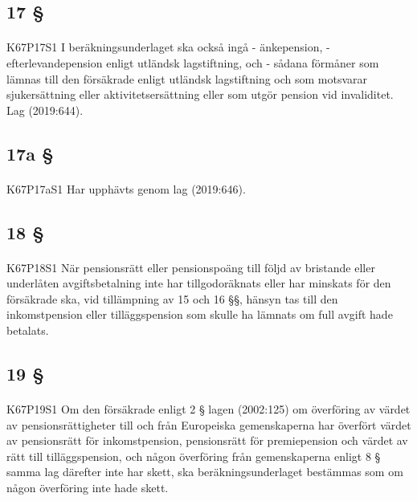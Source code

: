 \documentclass[a4paper,notitlepage,openany,10pt]{book}
\begin{document}
\subsection*{17 §}
\paragraph*{}
{\tiny K67P17S1}
I beräkningsunderlaget ska också ingå
\newline - änkepension,
\newline - efterlevandepension enligt utländsk lagstiftning, och
\newline - sådana förmåner som lämnas till den försäkrade enligt utländsk lagstiftning och som motsvarar sjukersättning eller aktivitetsersättning eller som utgör pension vid invaliditet.
Lag (2019:644).
\subsection*{17a §}
\paragraph*{}
{\tiny K67P17aS1}
Har upphävts genom
lag (2019:646).
\subsection*{18 §}
\paragraph*{}
{\tiny K67P18S1}
När pensionsrätt eller pensionspoäng till följd av bristande eller underlåten avgiftsbetalning inte har tillgodoräknats eller har minskats för den försäkrade ska, vid tillämpning av 15 och 16 §§, hänsyn tas till den inkomstpension eller tilläggspension som skulle ha lämnats om full avgift hade betalats.
\subsection*{19 §}
\paragraph*{}
{\tiny K67P19S1}
Om den försäkrade enligt 2 § lagen (2002:125) om överföring av värdet av pensionsrättigheter till och från Europeiska gemenskaperna har överfört värdet av pensionsrätt för inkomstpension, pensionsrätt för premiepension och värdet av rätt till tilläggspension, och någon överföring från gemenskaperna enligt 8 § samma lag därefter inte har skett, ska beräkningsunderlaget bestämmas som om någon överföring inte hade skett.
\end{document}

